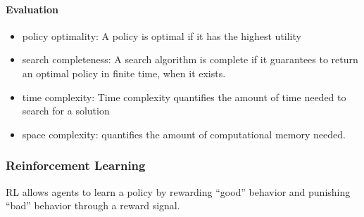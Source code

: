 \documentclass{article}
\begin{document}
 		\paragraph{Evaluation} \citet{rizk-2018-decision-making-in-multiagent-systems-a-survey}
 			\begin{itemize}
 				\item policy optimality: A policy is optimal if it has the highest utility
 				
 				\item search completeness: A search algorithm is complete if it guarantees to return an optimal policy
 				in finite time, when it exists.
 				
 				\item time complexity: Time complexity quantifies the amount of time needed to search for a solution 
 				
 				\item space complexity: quantifies the amount of computational memory
 				needed.
 			\end{itemize}
 		\subsubsection{Reinforcement Learning} RL allows agents to learn a policy by rewarding “good” behavior and punishing “bad” behavior through a reward signal.

	
\end{document}
